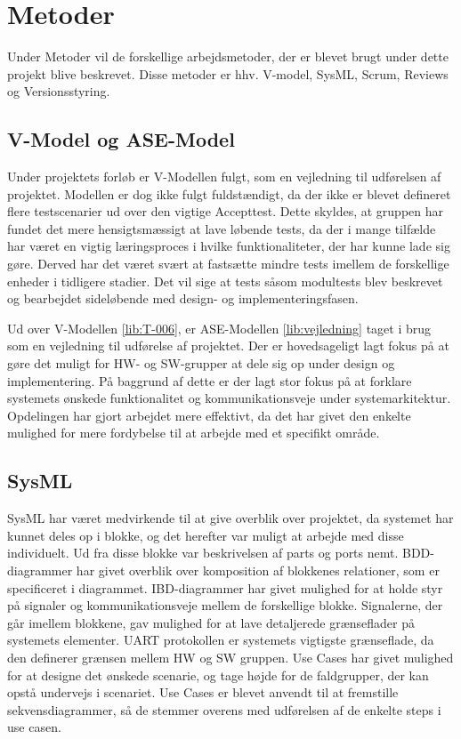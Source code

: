 \section{Metoder} \label{ch:Metoder}
Under Metoder vil de forskellige arbejdsmetoder, der er blevet brugt under dette projekt blive beskrevet. Disse metoder er hhv. V-model, SysML, Scrum, Reviews og Versionsstyring.

\subsection{V-Model og ASE-Model} 
Under projektets forløb er V-Modellen fulgt, som en vejledning til udførelsen af projektet. Modellen er dog ikke fulgt fuldstændigt, da der ikke er blevet defineret flere testscenarier ud over den vigtige Accepttest. Dette skyldes, at gruppen har fundet det mere hensigtsmæssigt at lave løbende tests, da der i mange tilfælde har været en vigtig læringsproces i hvilke funktionaliteter, der har kunne lade sig gøre. Derved har det været svært at fastsætte mindre tests imellem de forskellige enheder i tidligere stadier. Det vil sige at tests såsom modultests blev beskrevet og bearbejdet sideløbende med design- og implementeringsfasen.

Ud over V-Modellen \ref{lib:T-006}, er ASE-Modellen \ref{lib:vejledning} taget i brug som en vejledning til udførelse af projektet. Der er hovedsageligt lagt fokus på at gøre det muligt for HW- og SW-grupper at dele sig op under design og implementering. På baggrund af dette er der lagt stor fokus på at forklare systemets ønskede funktionalitet og kommunikationsveje under systemarkitektur. Opdelingen har gjort arbejdet mere effektivt, da det har givet den enkelte mulighed for mere fordybelse til at arbejde med et specifikt område.

\subsection{SysML}
SysML har været medvirkende til at give overblik over projektet, da systemet har kunnet deles op i blokke, og det herefter var muligt at arbejde med disse individuelt. Ud fra disse blokke var beskrivelsen af parts og ports nemt. BDD-diagrammer har givet overblik over komposition af blokkenes relationer, som er specificeret i diagrammet. IBD-diagrammer har givet mulighed for at holde styr på signaler og kommunikationsveje mellem de forskellige blokke. Signalerne, der går imellem blokkene, gav mulighed for at lave detaljerede grænseflader på systemets elementer. UART protokollen er systemets vigtigste grænseflade, da den definerer grænsen mellem HW og SW gruppen. Use Cases har givet mulighed for at designe det ønskede scenarie, og tage højde for de faldgrupper, der kan opstå undervejs i scenariet. Use Cases er blevet anvendt til at fremstille sekvensdiagrammer, så de stemmer overens med udførelsen af de enkelte steps i use casen.

